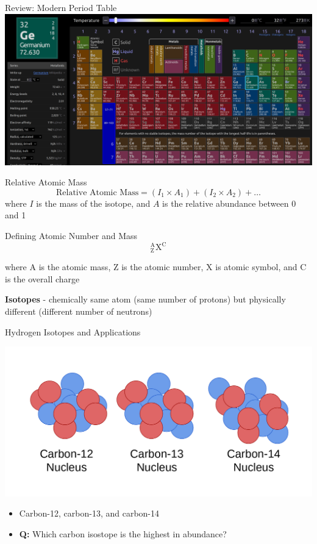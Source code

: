 \documentclass[11pt]{beamer}
\begin{document}
\begin{frame}{Review: Modern Period Table}
  \centering
  \includegraphics[width=\linewidth]{ptable}
\end{frame}

\begin{frame}{Relative Atomic Mass}
  \begin{equation}
    \text{Relative Atomic Mass} = (I_1\times A_1) + (I_2\times A_2) + \dots
  \end{equation}
  where $I$ is the mass of the isotope, and $A$ is the
  relative abundance between 0 and 1
\end{frame}

\begin{frame}{Defining Atomic Number and Mass}
  \begin{equation}
    ^\text{A}_\text{Z}\text{X}^\text{C}
  \end{equation}

  where A is the atomic mass, Z is the atomic number, X is atomic
  symbol, and C is the overall charge

  \textbf{Isotopes} - chemically same atom (same number of protons)
  but physically different (different number of neutrons)
\end{frame}

\begin{frame}{Hydrogen Isotopes and Applications}
  \begin{center}
    \includegraphics[width=0.75\linewidth]{carbon_isotopes}
  \end{center}

  \begin{itemize}
  \item Carbon-12, carbon-13, and carbon-14
  \item \textbf{Q:} Which carbon isostope is the highest in abundance?
  \end{itemize}
\end{frame}
\end{document}
